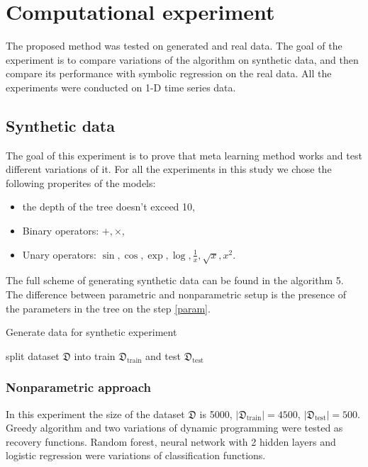 \documentclass[12pt]{article}
\begin{document}
\newpage

\section{Computational experiment}
The proposed method was tested on generated and real data.
The goal of the experiment is to compare variations of the algorithm on synthetic data, and then compare its performance with symbolic regression on the real data.
All the experiments were conducted on 1-D time series data.
\subsection{Synthetic data}
The goal of this experiment is to prove that meta learning method works and test different variations of it.
For all the experiments in this study we chose the following properites of the models:
\begin{itemize}
  \item the depth of the tree doesn't exceed 10,
  \item Binary operators: $+, \times$,
  \item Unary operators: $\sin, \cos, \exp, \log, \frac{1}{x}, \sqrt{x}, x^2$.
\end{itemize}

The full scheme of generating synthetic data can be found in the algorithm 5.
The difference between parametric and nonparametric setup is the presence of the parameters in the tree on the step \ref{param}.

\begin{algorithm}[!ht]
\caption{Generate data for synthetic experiment}
  split dataset $\mathfrak{D}$ into train $\mathfrak{D}_\text{train}$ and test $\mathfrak{D}_\text{test}$\;
\end{algorithm}


\subsubsection{Nonparametric approach}
In this experiment the size of the dataset $\mathfrak{D}$ is 5000, $|\mathfrak{D}_\text{train}| = 4500$, $|\mathfrak{D}_\text{test}| = 500$. Greedy algorithm and two variations of dynamic programming were tested as recovery functions.
Random forest, neural network with 2 hidden layers and logistic regression were variations of classification functions.
\end{document}
